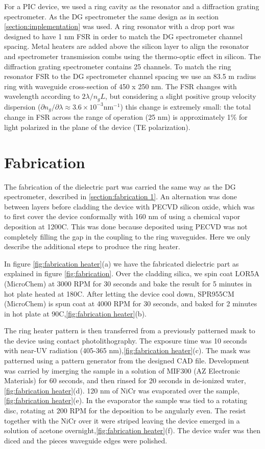 \documentclass[12pt,twoside,english]{book}
\renewcommand{\~}{\perispomeni}%
\DeclareRobustCommand{\textgreek}[1]{\leavevmode{\greektext #1}}
\numberwithin{equation}{section}
\numberwithin{figure}{section}
\begin{document}
For a PIC device, we used a ring cavity as the resonator and a diffraction grating spectrometer. As the DG spectrometer the same design as in section \ref{section:implementation} was used. A ring resonator with a drop port was designed to have 1 nm FSR in order to match the DG spectrometer channel spacing. Metal heaters are added above the silicon layer to align the resonator and spectrometer transmission combs using the thermo-optic effect in silicon. The diffraction grating spectrometer contains 25 channels. To match the ring resonator FSR to the DG spectrometer channel spacing we use an 83.5 \textgreek{m}m radius ring with waveguide cross-section of 450 x 250 nm. The FSR changes with wavelength according to $2\lambda/n_{g}L$, but considering a slight positive group velocity dispersion ($\partial n_{g}/\partial\lambda\approx3.6\times10^{-3}\text{nm}^{-1}$) this change is extremely small: the total change in FSR across the range of operation (25 nm) is approximately 1\% for light polarized in the plane of the device (TE polarization).

\section{Fabrication}

The fabrication of the dielectric part was carried the same way as the DG spectrometer, described in \ref{section:fabrication 1}. An alternation was done between layers before cladding the device with PECVD silicon oxide, which was to first cover the device conformally with 160 nm of  using a chemical vapor deposition at 1200\textdegree C. This was done because  deposited using PECVD was not completely filling the gap in the coupling to the ring waveguides. Here we only describe the additional steps to produce the ring heater.

In figure \ref{fig:fabrication heater}(a) we have the fabricated dielectric part as explained in figure \ref{fig:fabrication}. Over the cladding silica, we spin coat LOR5A (MicroChem) at 3000 RPM for 30 seconds and bake the result for 5 minutes in hot plate heated at 180\textdegree C. After letting the device cool down, SPR955CM (MicroChem) is spun coat at 4000 RPM for 30 seconds, and baked for 2 minutes in hot plate at 90\textdegree C,\ref{fig:fabrication heater}(b).

The ring heater pattern is then transferred from a previously patterned mask to the device using contact photolithography. The exposure time was 10 seconds with near-UV radiation (405-365 nm),\ref{fig:fabrication heater}(c). The mask was patterned using a pattern generator from the designed CAD file. Development was carried by imerging the sample in a solution of MIF300 (AZ Electronic Materials) for 60 seconds, and then rinsed for 20 seconds in de-ionized water,\ref{fig:fabrication heater}(d). 120 nm of NiCr was evaporated over the sample,\ref{fig:fabrication heater}(e). In the evaporator the sample was tied to a rotating disc, rotating at 200 RPM for the deposition to be angularly even. The resist together with the NiCr over it were striped leaving the device emerged in a solution of acetone overnight,\ref{fig:fabrication heater}(f). The device wafer was then diced and the pieces waveguide edges were polished.
\end{document}
